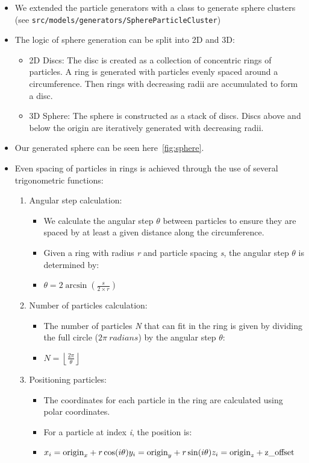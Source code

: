 \documentclass{article}
\begin{document}
\begin{itemize}
    \item We extended the particle generators with a class to generate sphere clusters (see \texttt{src/models/generators/SphereParticleCluster})
    \item The logic of sphere generation can be split into 2D and 3D:
    \begin{itemize}
        \item 2D Discs: The disc is created as a collection of concentric rings of particles. A ring is generated with particles evenly spaced around a circumference. Then rings with decreasing radii are accumulated to form a disc.
        \item 3D Sphere: The sphere is constructed as a stack of discs. Discs above and below the origin are iteratively generated with decreasing radii.
    \end{itemize}
    \item Our generated sphere can be seen here\ \ref{fig:sphere}.
    \item Even spacing of particles in rings is achieved through the use of several trigonometric functions:
    \begin{enumerate}
        \item Angular step calculation:
        \begin{itemize}
            \item We calculate the angular step $\theta$ between particles to ensure they are spaced by at least a given distance along the circumference.
            \item Given a ring with radius \textit{r} and particle spacing \textit{s}, the angular step $\theta$ is determined by:
            \item $\theta = 2 \arcsin\left(\frac{s}{2 \times r}\right)$
        \end{itemize}
        \item Number of particles calculation:
        \begin{itemize}
            \item The number of particles \textit{N} that can fit in the ring is given by dividing the full circle ($2\pi\ radians$) by the angular step $\theta$:
            \item $N = \left\lfloor \frac{2\pi}{\theta} \right\rfloor$
        \end{itemize}
        \item Positioning particles:
        \begin{itemize}
            \item The coordinates for each particle in the ring are calculated using polar coordinates.
            \item For a particle at index \textit{i}, the position is:
            \item $x_i = \text{origin}_x + r \cos(i \theta)\newline y_i = \text{origin}_y + r \sin(i \theta)\newline z_i = \text{origin}_z + \text{z\_offset}$
        \end{itemize}
    \end{enumerate}
\end{itemize}
\end{document}
